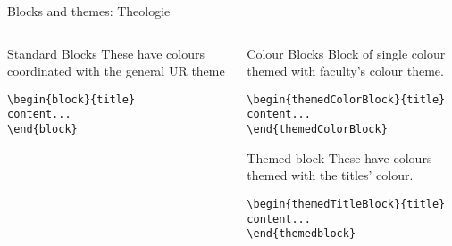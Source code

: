 \begingroup
{}
\begin{frame}[fragile]{Blocks and themes: Theologie}
\begin{columns} %
\begin{column}{0.3\textwidth}
\begin{block}{Standard Blocks}
These have colours coordinated with the general UR theme
\begin{verbatim}
\begin{block}{title}
content...
\end{block}
\end{verbatim}
\end{block}
\end{column}
\begin{column}{0.7\textwidth}
\begin{themedColorBlock}{Colour Blocks}
Block of single colour themed with faculty's colour theme.
\small
\begin{verbatim}
\begin{themedColorBlock}{title}
content...
\end{themedColorBlock}
\end{verbatim}
\end{themedColorBlock}
\begin{themedTitleBlock} {Themed block}
These have colours themed with the titles' colour.
\small
\begin{verbatim}
\begin{themedTitleBlock}{title}
content...
\end{themedblock}
\end{verbatim}
\end{themedTitleBlock}
\end{column}
\end{columns}
\end{frame}
\endgroup



